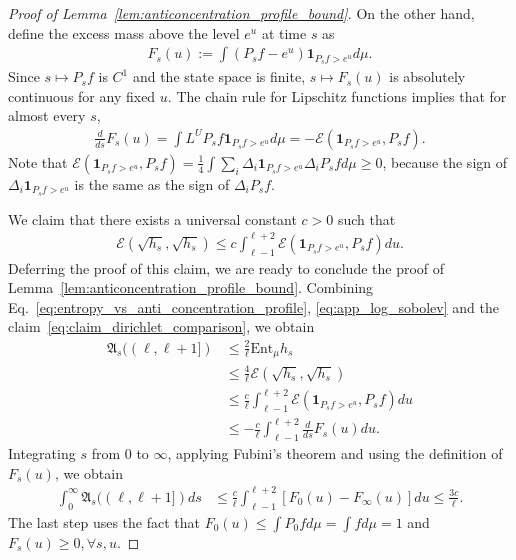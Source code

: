 \documentclass[11pt]{article}
\newcommand{\fA}{\mathfrak{A}}
\newcommand{\fL}{L^U}
\newcommand{\dirichlet}{\mathcal{E}}
\theoremstyle{named}
\theoremstyle{plain}
\newcommand{\defn}{:=}
\newcommand{\Ent}{\text{Ent}}
\newcommand{\brackets}[1]{\left[ #1 \right]}
\newcommand{\braces}[1]{\left\{ #1 \right \}}
\newcommand{\abss}[1]{\left| #1 \right |}
\begin{document}
\begin{proof}[Proof of Lemma~\ref{lem:anticoncentration_profile_bound}]
  On the other hand, define the excess mass above the level $e^{u}$ at time $s$ as
  \begin{align*}
    F_s(u) \defn \int (P_s f - e^{u}) \mathbf{1}_{P_s f > e^{u}} d\mu.
  \end{align*}
  Since $s \mapsto P_s f$ is $C^1$ and the state space is finite, $s \mapsto F_s(u)$ is absolutely continuous for any fixed $u$. The chain rule for Lipschitz functions implies that for almost every $s$,
  \begin{align}
    \label{eq:derivative_F_s}
    \frac{d}{ds} F_s(u) = \int \fL P_s f \mathbf{1}_{P_s f > e^{u}} d\mu = - \dirichlet(\mathbf{1}_{P_s f > e^{u}}, P_s f).
  \end{align}
  Note that $\dirichlet(\mathbf{1}_{P_s f > e^{u}}, P_s f) = \frac14 \int \sum_i \Delta_i \mathbf{1}_{P_s f > e^{u}}  \Delta_i P_s f d\mu \geq 0$, because the sign of $\Delta_i \mathbf{1}_{P_s f > e^{u}}$ is the same as the sign of $\Delta_i P_s f$. 
  

  We claim that there exists a universal constant $c > 0$ such that
  \begin{align}
    \label{eq:claim_dirichlet_comparison}
    \dirichlet(\sqrt{h_s}, \sqrt{h_s}) \leq c \int_{\ell-1}^{\ell+2} \dirichlet(\mathbf{1}_{P_s f > e^{u}}, P_s f) du.
  \end{align}
  Deferring the proof of this claim, we are ready to conclude the proof of Lemma~\ref{lem:anticoncentration_profile_bound}. Combining Eq.~\eqref{eq:entropy_vs_anti_concentration_profile}, \eqref{eq:app_log_sobolev} and the claim~\eqref{eq:claim_dirichlet_comparison}, we obtain
  \begin{align*}
    \fA_{s} ((\ell, \ell+1]) &\leq \frac{2}{\ell} \Ent_\mu h_s \\
    &\leq \frac{4}{\ell} \dirichlet(\sqrt{h_s}, \sqrt{h_s}) \\
    &\leq \frac{c}{\ell} \int_{\ell-1}^{\ell+2} \dirichlet(\mathbf{1}_{P_s f > e^{u}}, P_s f) du \\
    &\leq - \frac{c}{\ell} \int_{\ell-1}^{\ell+2} \frac{d}{ds} F_s(u) du.
  \end{align*}
  Integrating $s$ from $0$ to $\infty$, applying Fubini's theorem and using the definition of $F_s(u)$, we obtain
  \begin{align*}
    \int_{0}^\infty \fA_{s} ((\ell, \ell+1]) ds &\leq \frac{c}{\ell} \int_{\ell-1}^{\ell+2} \brackets{F_0(u) - F_\infty(u)} du \leq \frac{3c}{\ell}.
  \end{align*}
  The last step uses the fact that $F_0(u) \leq \int P_0 f d\mu = \int f d\mu = 1$ and $F_{s}(u) \geq 0, \forall s, u$.


\end{proof}
\end{document}
